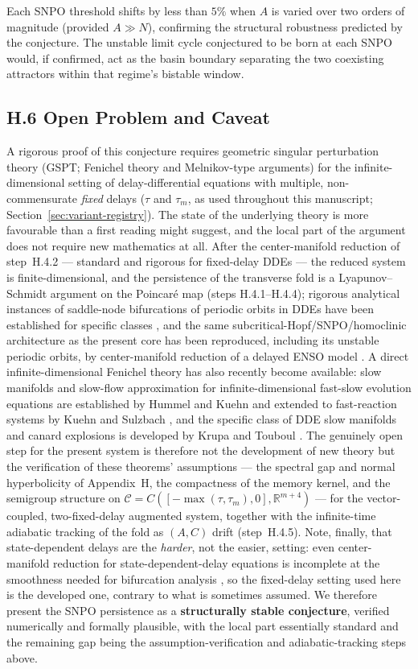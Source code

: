 \documentclass[twocolumn,10pt]{article}
\begin{document}
Each SNPO threshold shifts by less than $5\%$ when $A$ is varied over two orders of magnitude (provided $A \gg N$), confirming the structural robustness predicted by the conjecture. The unstable limit cycle conjectured to be born at each SNPO would, if confirmed, act as the basin boundary separating the two coexisting attractors within that regime's bistable window.

\subsection{H.6 Open Problem and Caveat}
A rigorous proof of this conjecture requires geometric singular perturbation theory (GSPT; Fenichel theory and Melnikov-type arguments) for the infinite-dimensional setting of delay-differential equations with multiple, non-commensurate \emph{fixed} delays (\(\tau\) and \(\tau_m\), as used throughout this manuscript; Section~\ref{sec:variant-registry}). The state of the underlying theory is more favourable than a first reading might suggest, and the local part of the argument does not require new mathematics at all. After the center-manifold reduction of step~H.4.2 --- standard and rigorous for fixed-delay DDEs \cite{hale1993,diekmann1995,faria1995,mielke1986} --- the reduced system is finite-dimensional, and the persistence of the transverse fold is a Lyapunov--Schmidt argument on the Poincar\'e map (steps H.4.1--H.4.4); rigorous analytical instances of saddle-node bifurcations of periodic orbits in DDEs have been established for specific classes \cite{beretka2020}, and the same subcritical-Hopf/SNPO/homoclinic architecture as the present core has been reproduced, including its unstable periodic orbits, by center-manifold reduction of a delayed ENSO model \cite{chekrounliu2024}. A direct infinite-dimensional Fenichel theory has also recently become available: slow manifolds and slow-flow approximation for infinite-dimensional fast-slow evolution equations are established by Hummel and Kuehn \cite{hummelkuehn2022} and extended to fast-reaction systems by Kuehn and Sulzbach \cite{kuehnsulzbach2024}, and the specific class of DDE slow manifolds and canard explosions is developed by Krupa and Touboul \cite{krupatouboul2016}. The genuinely open step for the present system is therefore not the development of new theory but the verification of these theorems' assumptions --- the spectral gap and normal hyperbolicity of Appendix~H, the compactness of the memory kernel, and the semigroup structure on \(\mathcal{C}=C([-\max(\tau,\tau_m),0],\mathbb R^{m+4})\) --- for the vector-coupled, two-fixed-delay augmented system, together with the infinite-time adiabatic tracking of the fold as \((A,C)\) drift (step~H.4.5). Note, finally, that state-dependent delays are the \emph{harder}, not the easier, setting: even center-manifold reduction for state-dependent-delay equations is incomplete at the smoothness needed for bifurcation analysis \cite{hartung2006}, so the fixed-delay setting used here is the developed one, contrary to what is sometimes assumed. We therefore present the SNPO persistence as a \textbf{structurally stable conjecture}, verified numerically and formally plausible, with the local part essentially standard and the remaining gap being the assumption-verification and adiabatic-tracking steps above.
\end{document}
